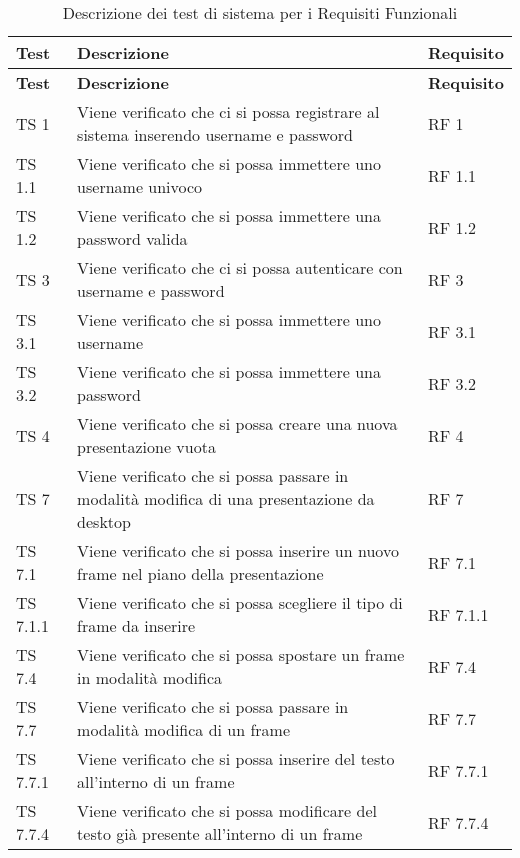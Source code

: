 {{	
		\renewcommand*{\arraystretch}{1.4}
		\begin{longtable} [c]{| p{3cm} | p{6cm} |p{3cm}|}
			\caption{Descrizione dei test di sistema per i Requisiti Funzionali
			 \label{tab:verReqFunz}}\\
			 \hline
			 \textbf{Test} & \textbf{Descrizione} & \textbf{Requisito} \\
			 \hline
			 \endfirsthead
			 \hline
			 \textbf{Test} & \textbf{Descrizione} & \textbf{Requisito} \\
			 \hline
			\endhead
			 \hline
			 \endfoot
			 \hline
			 \endlastfoot
			TS 1 & Viene verificato che ci si possa registrare al sistema inserendo username e password & RF 1\\
			\hline
			TS 1.1 & Viene verificato che si possa immettere uno username univoco & RF 1.1\\
			\hline
			TS 1.2 & Viene verificato che si possa immettere una password valida & RF 1.2\\
			\hline
			TS 3 & Viene verificato che ci si possa autenticare con username e password & RF 3\\
			\hline
			TS 3.1 & Viene verificato che si possa immettere uno username & RF 3.1\\
			\hline
			TS 3.2 & Viene verificato che si possa immettere una password & RF 3.2\\
			\hline
			TS 4 & Viene verificato che si possa creare una nuova presentazione vuota & RF 4\\
			\hline
			TS 7 & Viene verificato che si possa passare in modalità modifica di una presentazione da desktop\ped{g} & RF 7\\
			\hline
			TS 7.1 & Viene verificato che si possa inserire un nuovo frame\ped{g} nel piano della presentazione\ped{g} & RF 7.1\\
			\hline
			TS 7.1.1 & Viene verificato che si possa scegliere il tipo di frame\ped{g} da inserire & RF 7.1.1\\
			\hline
			TS 7.4 & Viene verificato che si possa spostare un frame\ped{g} in modalità modifica & RF 7.4\\
			\hline
			TS 7.7 & Viene verificato che si possa passare in modalità modifica di un frame\ped{g} & RF 7.7\\
			\hline
			TS 7.7.1 & Viene verificato che si possa inserire del testo all'interno di un frame\ped{g} & RF 7.7.1\\
			\hline
			TS 7.7.4 & Viene verificato che si possa modificare del testo già presente all'interno di un frame\ped{g} & RF 7.7.4\\

\end{longtable}}}
